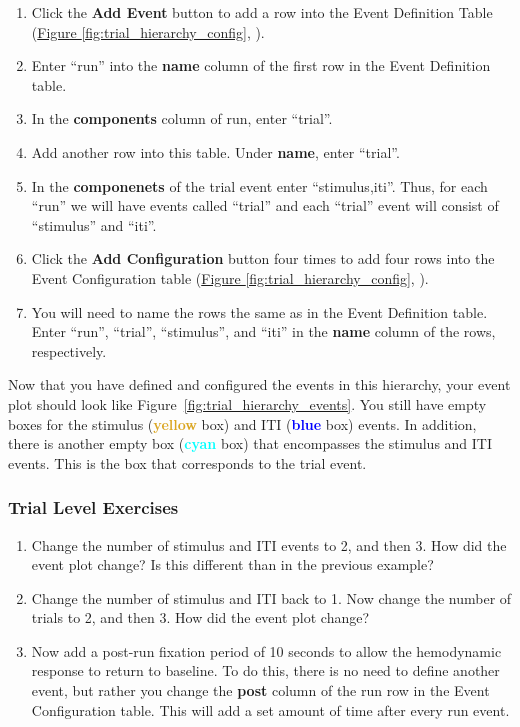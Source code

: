 \documentclass[10pt]{article}
\newcommand*\circled[1]{\tikz[baseline=(char.base)]{
            \node[shape=circle,draw,inner sep=.5pt] (char) {#1};}}
\begin{document}
		\begin{enumerate}
			\item Click the \textbf{Add Event} button to add a row into the Event Definition Table (\hyperref[fig:trial_hierarchy_config]{Figure \ref{fig:trial_hierarchy_config}}, \circled{1}).
			\item Enter ``run'' into the \textbf{name} column of the first row in the Event Definition table.
			\item In the \textbf{components} column of run, enter ``trial''.
			\item Add another row into this table. Under \textbf{name}, enter ``trial''.
			\item In the \textbf{componenets} of the trial event enter ``stimulus,iti''.
			Thus, for each ``run'' we will have events called ``trial'' and each ``trial'' event will consist of ``stimulus'' and ``iti''.
			\item Click the \textbf{Add Configuration} button four times to add four rows into the Event Configuration table (\hyperref[fig:trial_hierarchy_config]{Figure \ref{fig:trial_hierarchy_config}}, \circled{2}).
			\item You will need to name the rows the same as in the Event Definition table.
			Enter ``run'', ``trial'', ``stimulus'', and ``iti'' in the \textbf{name} column of the rows, respectively.
		\end{enumerate}

		Now that you have defined and configured the events in this hierarchy, your event plot should look like Figure~\ref{fig:trial_hierarchy_events}.
		You still have empty boxes for the stimulus (\textcolor{Goldenrod}{\textbf{yellow}} box) and ITI (\textcolor{blue}{\textbf{blue}} box) events.
		In addition, there is another empty box (\textcolor{Cyan}{\textbf{cyan}} box) that encompasses the stimulus and ITI events.
		This is the box that corresponds to the trial event.

		\subsubsection*{Trial Level Exercises}
		\label{subsubsection:trial_hier_ex}
			\begin{enumerate}
				\item Change the number of stimulus and ITI events to 2, and then 3. 
				How did the event plot change? Is this different than in the previous example?
				\item Change the number of stimulus and ITI back to 1.
				Now change the number of trials to 2, and then 3.
				How did the event plot change?
				\item Now add a post-run fixation period of 10 seconds to allow the hemodynamic response to return to baseline.
				To do this, there is no need to define another event, but rather you change the \textbf{post} column of the run row in the Event Configuration table.
				This will add a set amount of time after every run event.
			\end{enumerate}
	\newpage
\end{document}

